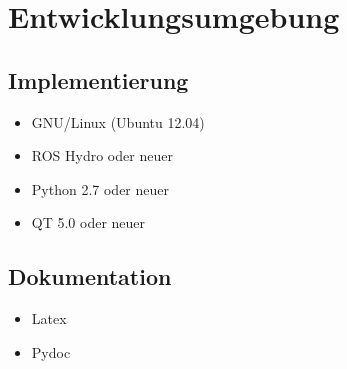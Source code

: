\chapter{Entwicklungsumgebung}

\section{Implementierung}

\begin{itemize}
  \item GNU/Linux (Ubuntu 12.04)
  \item ROS Hydro oder neuer
  \item Python 2.7 oder neuer
  \item QT 5.0 oder neuer
\end{itemize}

\section{Dokumentation}

\begin{itemize}
  \item Latex
  \item Pydoc
\end{itemize}
